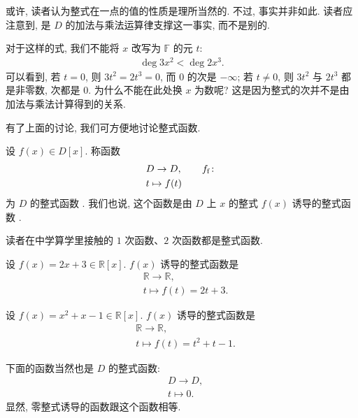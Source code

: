 \begin{remark}
    或许, 读者认为整式在一点的值的性质是理所当然的. 不过, 事实并非如此. 读者应注意到, 是 $D$ 的加法与乘法运算律支撑这一事实, 而不是别的.

    对于这样的式, 我们不能将 $x$ 改写为 $\mathbb{F}$ 的元 $t$:
    \begin{align*}
        \deg 3x^2 < \deg 2x^3.
    \end{align*}
    可以看到, 若 $t=0$, 则 $3t^2 = 2t^3 = 0$, 而 $0$ 的次是 $-\infty$; 若 $t \neq 0$, 则 $3t^2$ 与 $2t^3$ 都是非零数, 次都是 $0$. 为什么不能在此处换 $x$ 为数呢? 这是因为整式的次并不是由加法与乘法计算得到的关系.
\end{remark}

有了上面的讨论, 我们可方便地讨论整式函数.

\begin{definition}
    设 $f(x) \in D[x]$. 称函数
    \begin{align*}
         & D \to D, \tag*{$f_\mathrm{f} \colon$} \\
         & t \mapsto f(t)
    \end{align*}
    为 $D$ 的整式函数 . 我们也说, 这个函数是由 $D$ 上 $x$ 的整式 $f(x)$ 诱导的整式函数 .
\end{definition}

读者在中学算学里接触的 $1$ 次函数、$2$ 次函数都是整式函数.

\begin{example}
    设 $f(x) = 2x + 3 \in \mathbb{R}[x]$. $f(x)$ 诱导的整式函数是
    \begin{align*}
         & \mathbb{R} \to \mathbb{R}, \\
         & t \mapsto f(t) = 2t + 3.
    \end{align*}
\end{example}

\begin{example}
    设 $f(x) = x^2 + x - 1 \in \mathbb{R}[x]$. $f(x)$ 诱导的整式函数是
    \begin{align*}
         & \mathbb{R} \to \mathbb{R},    \\
         & t \mapsto f(t) = t^2 + t - 1.
    \end{align*}
\end{example}

\begin{example}
    下面的函数当然也是 $D$ 的整式函数:
    \begin{align*}
         & D \to D,     \\
         & t \mapsto 0.
    \end{align*}
    显然, 零整式诱导的函数跟这个函数相等.
\end{example}

